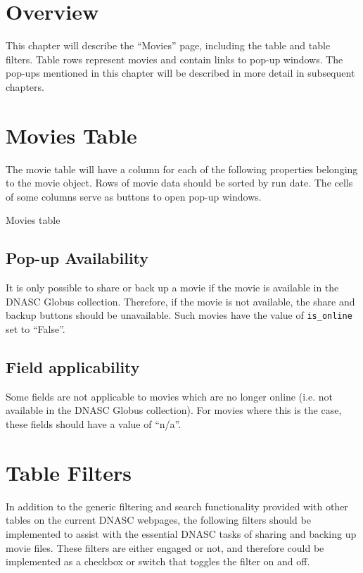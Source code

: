 
\section{Overview}

This chapter will describe the ``Movies'' page, including the table and
table filters. Table rows represent movies and contain links to pop-up windows. The pop-ups 
mentioned in this chapter will be described in more detail in subsequent chapters.

\section{Movies Table}
The movie table will have a column for each of the following properties belonging to the movie 
object. Rows of movie data should be sorted by run date. The cells of some columns serve as 
buttons to open pop-up windows.

\begin{table}[h]
    
    \caption{Movies table}
\end{table}

\subsection{Pop-up Availability}

It is only possible to share or back up a movie if the movie is available in the DNASC Globus
collection. Therefore, if the movie is not available, the share and backup buttons should be
unavailable. Such movies have the value of \texttt{is\_online} set to ``False''.

\subsection{Field applicability}

Some fields are not applicable to movies which are no longer online (i.e. not available in the
DNASC Globus collection). For movies where this is the case, these fields should have a value
of ``n/a''.

\section{Table Filters}

In addition to the generic filtering and search functionality provided with other tables on the
current DNASC webpages, the following filters should be implemented to assist with the essential 
DNASC tasks of sharing and backing up movie files. These filters are either engaged or not, and 
therefore could be implemented as a checkbox or switch that toggles the filter on and off.

